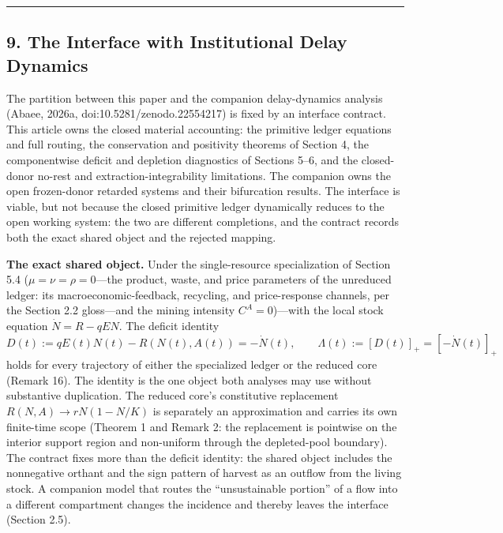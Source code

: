 \documentclass[11pt]{article}
\begin{document}
\begin{center}\rule{0.5\linewidth}{0.5pt}\end{center}

\subsection{9. The Interface with Institutional Delay
Dynamics}\label{the-interface-with-institutional-delay-dynamics}

The partition between this paper and the companion delay-dynamics analysis (Abaee, 2026a, doi:10.5281/\allowbreak{}zenodo.22554217) is fixed by an interface contract. This article owns the closed material accounting: the primitive ledger equations and full routing, the conservation and positivity theorems of Section 4, the componentwise deficit and depletion diagnostics of Sections 5--6, and the closed-donor no-rest and extraction-integrability limitations. The companion owns the open frozen-donor retarded systems and their bifurcation results. The interface is viable, but not because the closed primitive ledger dynamically reduces to the open working system: the two are different completions, and the contract records both the exact shared object and the rejected mapping.

\textbf{The exact shared object.} Under the single-resource specialization of Section 5.4 (\(\mu = \nu = \rho = 0\)---the product, waste, and price parameters of the unreduced ledger: its macroeconomic-feedback, recycling, and price-response channels, per the Section 2.2 gloss---and the mining intensity \(C^A = 0\))---with the local stock equation \(\dot N = R - qEN\). The deficit identity \[D(t) := qE(t)N(t) - R(N(t), A(t)) = -\dot N(t), \qquad \Lambda(t) := [D(t)]_+ = [-\dot N(t)]_+\] holds for every trajectory of either the specialized ledger or the reduced core (Remark 16). The identity is the one object both analyses may use without substantive duplication. The reduced core's constitutive replacement \(R(N,A) \to rN(1 - N/\allowbreak{}K)\) is separately an approximation and carries its own finite-time scope (Theorem 1 and Remark 2: the replacement is pointwise on the interior support region and non-uniform through the depleted-pool boundary). The contract fixes more than the deficit identity: the shared object includes the nonnegative orthant and the sign pattern of harvest as an outflow from the living stock. A companion model that routes the ``unsustainable portion'' of a flow into a different compartment changes the incidence and thereby leaves the interface (Section 2.5).
\end{document}
